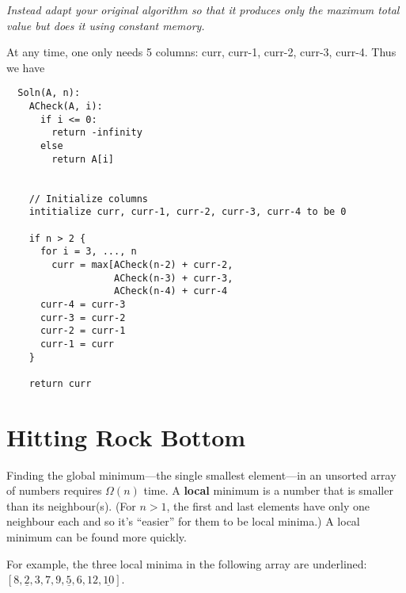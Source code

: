 \documentclass[11pt, oneside]{article}   	%
\theoremstyle{definition}
\theoremstyle{remark}
\begin{document}
\textit{Instead adapt your original algorithm so that it produces only the
maximum total value but does it using constant memory.}

At any time, one only needs 5 columns: curr, curr-1, curr-2, curr-3, curr-4. Thus we have

\begin{verbatim}
  Soln(A, n):
    ACheck(A, i):
      if i <= 0:
        return -infinity
      else
        return A[i]
    
    
    // Initialize columns
    intitialize curr, curr-1, curr-2, curr-3, curr-4 to be 0
    
    if n > 2 {
      for i = 3, ..., n
        curr = max[ACheck(n-2) + curr-2,
                   ACheck(n-3) + curr-3,
                   ACheck(n-4) + curr-4
      curr-4 = curr-3
      curr-3 = curr-2
      curr-2 = curr-1
      curr-1 = curr    
    }

    return curr
\end{verbatim}

\clearpage
\section{Hitting Rock Bottom}
\label{sec-3}

Finding the global minimum---the single smallest element---in an
unsorted array of numbers requires $\Omega(n)$ time.  A \textbf{local}
minimum is a number that is smaller than its neighbour(s). (For $n>1$,
the first and last elements have only one neighbour each and so it's
``easier'' for them to be local minima.) A local minimum can be found
more quickly.

For example, the three local minima in the following array are
underlined: $[8, \underline{2}, 3, 7, 9, \underline{5}, 6, 12,
\underline{10}]$.
\end{document}
